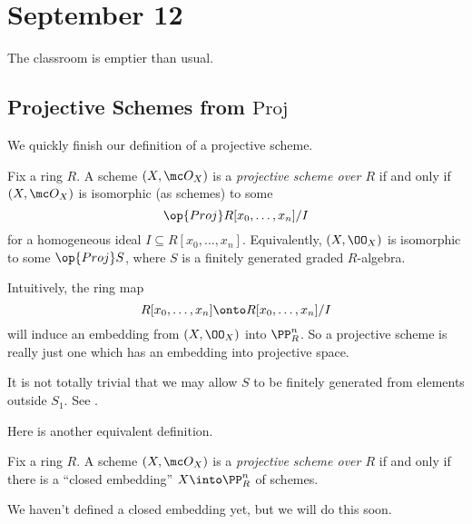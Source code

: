 \documentclass[../notes.tex]{subfiles}
\begin{document}
\section{September 12}

The classroom is emptier than usual.

\subsection{Projective Schemes from \texorpdfstring{$\mathrm{Proj}$}{ Proj}}
We quickly finish our definition of a projective scheme.
\begin{definition}
	Fix a ring $R$. A scheme $(X,\mc O_X)$ is a \textit{projective scheme over $R$} if and only if $(X,\mc O_X)$ is isomorphic (as schemes) to some
	\[\op{Proj}R[x_0,\ldots,x_n]/I\]
	for a homogeneous ideal $I\subseteq R[x_0,\ldots,x_n]$. Equivalently, $(X,\OO_X)$ is isomorphic to some $\op{Proj}S$, where $S$ is a finitely generated graded $R$-algebra.
\end{definition}
Intuitively, the ring map
\[R[x_0,\ldots,x_n]\onto R[x_0,\ldots,x_n]/I\]
will induce an embedding from $(X,\OO_X)$ into $\PP^n_R$. So a projective scheme is really just one which has an embedding into projective space.
\begin{remark}
	It is not totally trivial that we may allow $S$ to be finitely generated from elements outside $S_1$. See \cite[Section~7.4.4]{rising-sea}.
\end{remark}
Here is another equivalent definition.
\begin{definition}
	Fix a ring $R$. A scheme $(X,\mc O_X)$ is a \textit{projective scheme over $R$} if and only if there is a ``closed embedding'' $X\into\PP^n_R$ of schemes.
\end{definition}
We haven't defined a closed embedding yet, but we will do this soon.
\end{document}

